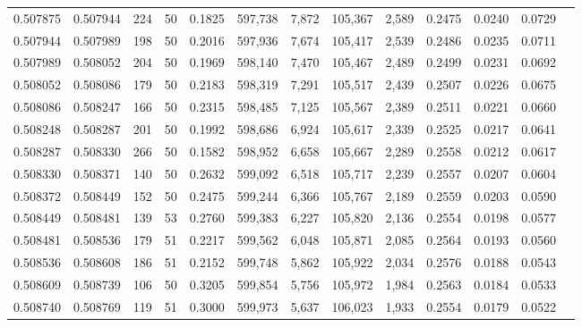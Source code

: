 \begin{tabular}{rrrrrrrrrrrrr}
0.507875 & 0.507944 & 224 &  50 &                                     0.1825 & 597,738 &   7,872 & 105,367 &   2,589 & 0.2475 & 0.0240 & 0.0729 \\
0.507944 & 0.507989 & 198 &  50 &                                     0.2016 & 597,936 &   7,674 & 105,417 &   2,539 & 0.2486 & 0.0235 & 0.0711 \\
0.507989 & 0.508052 & 204 &  50 &                                     0.1969 & 598,140 &   7,470 & 105,467 &   2,489 & 0.2499 & 0.0231 & 0.0692 \\
0.508052 & 0.508086 & 179 &  50 &                                     0.2183 & 598,319 &   7,291 & 105,517 &   2,439 & 0.2507 & 0.0226 & 0.0675 \\
0.508086 & 0.508247 & 166 &  50 &                                     0.2315 & 598,485 &   7,125 & 105,567 &   2,389 & 0.2511 & 0.0221 & 0.0660 \\
0.508248 & 0.508287 & 201 &  50 &                                     0.1992 & 598,686 &   6,924 & 105,617 &   2,339 & 0.2525 & 0.0217 & 0.0641 \\
0.508287 & 0.508330 & 266 &  50 &                                     0.1582 & 598,952 &   6,658 & 105,667 &   2,289 & 0.2558 & 0.0212 & 0.0617 \\
0.508330 & 0.508371 & 140 &  50 &                                     0.2632 & 599,092 &   6,518 & 105,717 &   2,239 & 0.2557 & 0.0207 & 0.0604 \\
0.508372 & 0.508449 & 152 &  50 &                                     0.2475 & 599,244 &   6,366 & 105,767 &   2,189 & 0.2559 & 0.0203 & 0.0590 \\
0.508449 & 0.508481 & 139 &  53 &                                     0.2760 & 599,383 &   6,227 & 105,820 &   2,136 & 0.2554 & 0.0198 & 0.0577 \\
0.508481 & 0.508536 & 179 &  51 &                                     0.2217 & 599,562 &   6,048 & 105,871 &   2,085 & 0.2564 & 0.0193 & 0.0560 \\
0.508536 & 0.508608 & 186 &  51 &                                     0.2152 & 599,748 &   5,862 & 105,922 &   2,034 & 0.2576 & 0.0188 & 0.0543 \\
0.508609 & 0.508739 & 106 &  50 &                                     0.3205 & 599,854 &   5,756 & 105,972 &   1,984 & 0.2563 & 0.0184 & 0.0533 \\
0.508740 & 0.508769 & 119 &  51 &                                     0.3000 & 599,973 &   5,637 & 106,023 &   1,933 & 0.2554 & 0.0179 & 0.0522 \\

\end{tabular}
